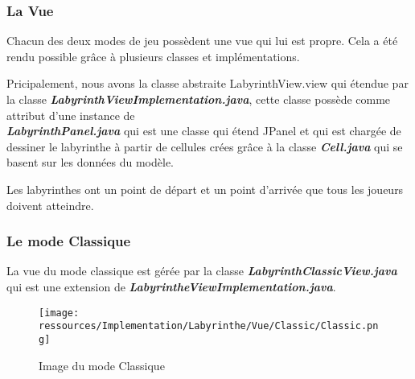 \subsubsection{La Vue}
\label{subsubsec:vue}

Chacun des deux modes de jeu possèdent une vue qui lui est propre.
Cela a été rendu possible grâce à plusieurs classes et implémentations.

Pricipalement, nous avons la classe abstraite LabyrinthView.view qui étendue par la classe \textbf{\textit{LabyrinthViewImplementation.java}}, cette classe possède comme attribut d'une instance de \\
\textbf{\textit{LabyrinthPanel.java}} qui est une classe qui étend JPanel et qui est chargée de dessiner le labyrinthe à partir de cellules crées grâce à la classe \textbf{\textit{Cell.java}} qui se basent sur les données du modèle.

Les labyrinthes ont un point de départ et un point d'arrivée que tous les joueurs doivent atteindre.

\newpage

\subsubsection*{Le mode Classique}

La vue du mode classique est gérée par la classe \textbf{\textit{LabyrinthClassicView.java}} qui est une extension de \textbf{\textit{LabyrintheViewImplementation.java}}.

\begin{figure}[!htb]
    \texttt{[image: ressources/Implementation/Labyrinthe/Vue/Classic/Classic.png]}
    \centering
    \caption{Image du mode Classique}
\end{figure}